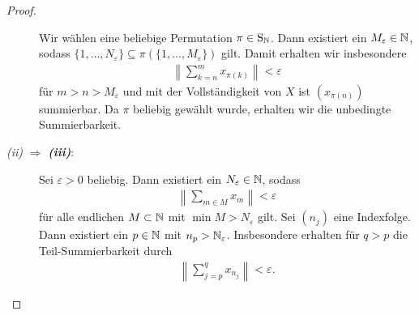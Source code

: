 \begin{proof}
\begin{description}
		Wir wählen eine beliebige Permutation $ \pi \in \mathrm{S}_{\mathbb{N}} $.
		Dann existiert ein $ M_\varepsilon \in \mathbb{N} $, sodass $ \{1,...,N_\varepsilon\} \subseteq 
		\pi(\{1,...,M_\varepsilon\}) $ gilt. Damit erhalten wir insbesondere
		\begin{align*}
			\left\| \sum \limits_{k=n}^m x_{\pi(k)} \right\| < \varepsilon
		\end{align*}
		für $ m > n > M_\varepsilon $ und mit der Vollständigkeit von $ X $ ist $ (x_{\pi(n)}) $ summierbar. Da $ \pi $ beliebig gewählt wurde, erhalten wir die unbedingte Summierbarkeit.
		\item[\textit{ \itshape\textrm{(ii)}} $ \Rightarrow $ \textbf{\textit{\textrm{(iii)}}}:]
		Sei $ \varepsilon > 0  $ beliebig. Dann existiert ein $ N_\varepsilon  \in \mathbb{N}$, sodass
		\begin{align*}
			\left\| \sum \limits_{m \in M } x_m \right\| < \varepsilon
		\end{align*}
		für alle endlichen $ M \subset \mathbb{N} $ mit $ \min M > N_\varepsilon $ gilt.
		Sei $ (n_j) $ eine Indexfolge.
		Dann existiert ein $ p \in \mathbb{N} $ mit $ n_p > \mathbb{N}_\varepsilon $. 
		Insbesondere erhalten für $ q > p $ die Teil-Summierbarkeit durch
		\begin{align*}
			\left\| \sum \limits_{j = p}^q x_{n_j} \right\| < \varepsilon.
		\end{align*}
	
		
		

\end{description}
\end{proof}

